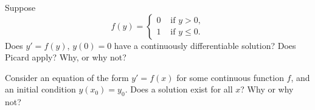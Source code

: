 \documentclass{ximera}
\begin{document}
\begin{exercise}[tricky]%
    Suppose
    \begin{equation*}
        f(y) =
        \begin{cases}
            0 & \text{ if $y > 0$}, \\
            1 & \text{ if $y \leq 0$} .
        \end{cases}
    \end{equation*}
    Does $y' = f(y)$, $y(0) = 0$ have a continuously differentiable solution?  Does Picard apply?  Why, or why not?
\end{exercise}

\begin{exercise}%
    Consider an equation of the form $y' = f(x)$ for some continuous function $f$, and an initial condition $y(x_0) = y_0$.  Does a solution exist for all $x$?  Why or why not?
\end{exercise}
\end{document}
